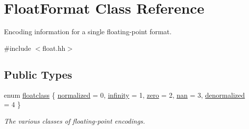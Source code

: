 \hypertarget{class_float_format}{}\section{Float\+Format Class Reference}
\label{class_float_format}


Encoding information for a single floating-\/point format.  




{\ttfamily \#include $<$float.\+hh$>$}

\subsection*{Public Types}
\begin{DoxyCompactItemize}
\item 
enum \mbox{\hyperlink{class_float_format_a18acf57dc2fa19c8afe87fa1f61a0481}{floatclass}} \{ \newline
\mbox{\hyperlink{class_float_format_a18acf57dc2fa19c8afe87fa1f61a0481af3348da859f2ff00a47e32cc28a2edff}{normalized}} = 0, 
\mbox{\hyperlink{class_float_format_a18acf57dc2fa19c8afe87fa1f61a0481afeac6c1ae11af57235ccfa9c04d24a95}{infinity}} = 1, 
\mbox{\hyperlink{class_float_format_a18acf57dc2fa19c8afe87fa1f61a0481aa26c0572abbf40f500f62893f06d478f}{zero}} = 2, 
\mbox{\hyperlink{class_float_format_a18acf57dc2fa19c8afe87fa1f61a0481ae3b854531adab08356b32f687c2227de}{nan}} = 3, 
\newline
\mbox{\hyperlink{class_float_format_a18acf57dc2fa19c8afe87fa1f61a0481a15a0236a6b55e962846bdb2ae698cbeb}{denormalized}} = 4
 \}
\begin{DoxyCompactList}\small\item\em The various classes of floating-\/point encodings. \end{DoxyCompactList}\end{DoxyCompactItemize}
